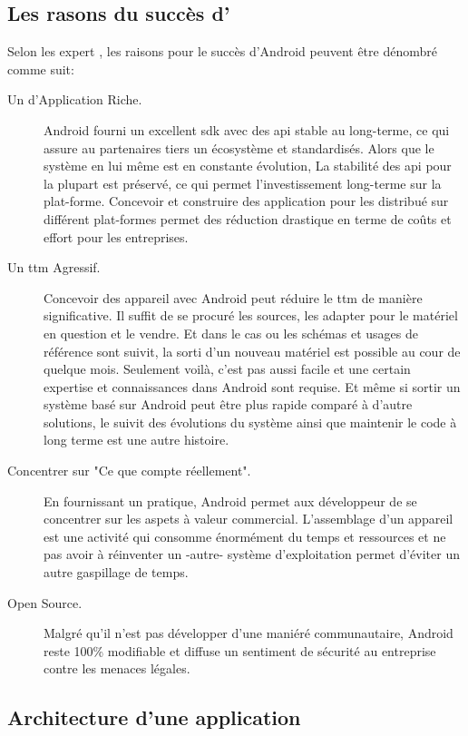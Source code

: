 \subsection{Les rasons du succès d'\android} %
Selon les expert \cite{lft:growth_of_android}, les raisons pour le succès d'Android peuvent être dénombré comme suit:
\begin{description}
\item[Un  d'Application Riche.] Android fourni un excellent \gls{sdk} avec des \gls{api} stable au long-terme, ce qui assure au partenaires tiers un écosystème et  standardisés. Alors que le système en lui même est en constante évolution, La stabilité des \gls{api} pour la plupart est préservé, ce qui permet l'investissement long-terme sur la plat-forme. Concevoir et construire des application pour les distribué sur différent plat-formes permet des réduction drastique en terme de coûts et effort pour les entreprises.

\item[Un \gls{ttm} Agressif.] Concevoir des appareil avec Android peut réduire le \gls{ttm} de manière significative. Il suffit de se procuré les sources, les adapter pour le matériel en question et le vendre. Et dans le cas ou les schémas et usages de référence sont suivit, la sorti d'un nouveau matériel est possible au cour de quelque mois. Seulement voilà, c'est pas aussi facile et une certain expertise et connaissances dans Android sont requise. Et même si sortir un système basé sur Android peut être plus rapide comparé à d'autre solutions, le suivit des évolutions du système ainsi que maintenir le code à long terme est une autre histoire.

\item[Concentrer sur "Ce que compte réellement".] En fournissant un  pratique, Android permet aux développeur de se concentrer sur les aspets à valeur commercial. L'assemblage d'un appareil est une activité qui consomme énormément du temps et ressources et ne pas avoir à réinventer un -autre- système d'exploitation permet d'éviter un autre gaspillage de temps.

\item[Open Source.] Malgré qu'il n'est pas développer d'une maniéré communautaire, Android reste 100\% modifiable et diffuse un sentiment de sécurité au entreprise contre les menaces légales.
\end{description}
\subsection{Architecture d'une application \android}

